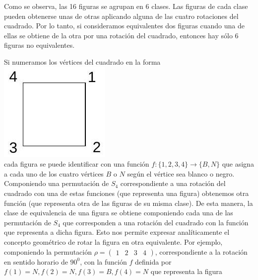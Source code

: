 \documentclass[10pt]{article}
\begin{document}
Como se observa, las 16 figuras se agrupan en 6 clases. Las figuras de cada clase pueden obtenerse unas de otras aplicando alguna de las cuatro rotaciones del cuadrado. Por lo tanto, si consideramos equivalentes dos figuras cuando una de ellas se obtiene de la otra por una rotación del cuadrado, entonces hay sólo 6 figuras no equivalentes.

Si numeramos los vértices del cuadrado en la forma\\
\includegraphics[max width=\textwidth, center]{2025_09_05_3ba26226ec0baddb5a03g-51(2)}\\
cada figura se puede identificar con una función $f:\{1,2,3,4\} \longrightarrow\{B, N\}$ que asigna a cada uno de los cuatro vértices $B$ o $N$ según el vértice sea blanco o negro. Componiendo una permutación de $S_{4}$ correspondiente a una rotación del cuadrado con una de estas funciones (que representa una figura) obtenemos otra función (que representa otra de las figuras de su misma clase). De esta manera, la clase de equivalencia de una figura se obtiene componiendo cada una de las permutación de $S_{4}$ que corresponden a una rotación del cuadrado con la función que representa a dicha figura. Esto nos permite expresar analíticamente el concepto geométrico de rotar la figura en otra equivalente. Por ejemplo, componiendo la permutación $\rho=\left(\begin{array}{llll}1 & 2 & 3 & 4\end{array}\right)$, correspondiente a la rotación en sentido horario de $90^{0}$, con la función $f$ definida por $f(1)=N, f(2)=N, f(3)=B, f(4)=N$ que representa la figura\\
\end{document}

